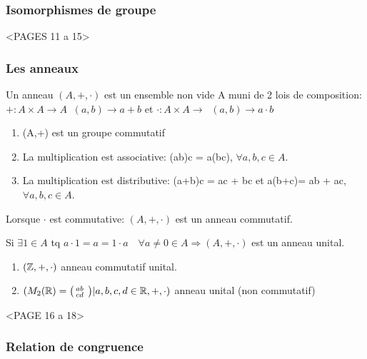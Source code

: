 \subsubsection{Isomorphismes de groupe}

<PAGES 11 a 15>

\subsubsection{Les anneaux}

\begin{defn}
Un anneau $(A,+,\cdot)$ est un ensemble non vide A muni de 2 lois de composition: $+ : A \times A \rightarrow A \;\; (a,b) \rightarrow a+b$ et $\cdot : A \times A \rightarrow \;\; (a,b) \rightarrow a\cdot b$

\begin{enumerate}
	\item (A,+) est un groupe commutatif
	\item La multiplication est associative: (ab)c = a(bc), $\forall a,b,c \in A$.
	\item La multiplication est distributive: (a+b)c = ac + bc et a(b+c)= ab + ac, $\forall a,b,c \in A$.
\end{enumerate}
\end{defn}

\begin{defn}
Lorsque $\cdot$ est commutative: $(A,+,\cdot)$ est un anneau commutatif.

Si $\exists 1 \in A$ tq $a\cdot 1 = a = 1 \cdot a \quad \forall a \neq 0 \in A \Rightarrow (A,+,\cdot)$ est un anneau unital.
\end{defn}

\begin{exmp}
	\begin{enumerate}
	\item $(\mathbb{Z},+,\cdot)$ anneau commutatif unital.
	\item $(M_2 (\mathbb{R}) = { \bigl( \begin{smallmatrix} a b&\\c d& \end{smallmatrix}\bigr)  | a,b,c,d \in \mathbb{R} },+,\cdot )$ anneau unital (non commutatif) 
	\end{enumerate}
\end{exmp}

<PAGE 16 a 18>

\subsubsection{Relation de congruence}

